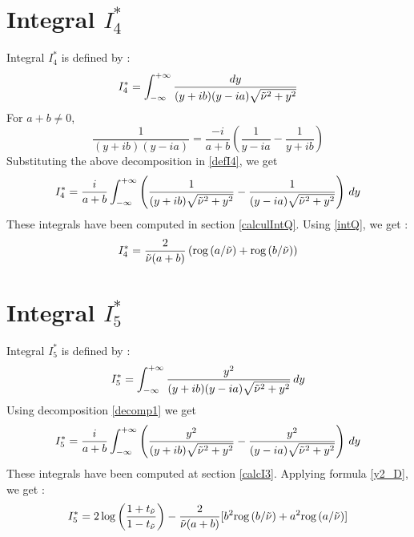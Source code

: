 \section{Integral $I_4^*$}
\label{calcI4}
Integral $I_4^*$ is defined by :
\begin{equation}
I_4^*=\int_{-\infty}^{+\infty} \dfrac{dy}{(y+ib)(y-ia)\sqrt{\tilde{\nu}^2+y^2}}
\label{defI4}
\end{equation}
For $a+b\neq0$, 
\begin{equation}
    \frac{1}{(y+ib)(y-ia)}=\frac{-i}{a+b}\left( \frac{1}{y-ia}-\frac{1}{y+ib}\right)
    \label{decomp1}
\end{equation}
Substituting the above decomposition in \eqref{defI4}, we get
\begin{equation}
I_4^*=\frac{i}{a+b} \int_{-\infty}^{+\infty} \left(\frac{1}{(y+ib)\sqrt{\tilde{\nu}^2+y^2}}-\frac{1}{(y-ia)\sqrt{\tilde{\nu}^2+y^2}} \right)\,dy
\end{equation}
These integrals have been computed in section \ref{calculIntQ}. Using \eqref{intQ}, we get :
\begin{equation}
I_4^*=\frac{2}{\tilde{\nu}(a+b)}\left(\mbox{rog}\left(a/\tilde{\nu}\right)+\mbox{rog}\left(b/\tilde{\nu}\right) \right)
\label{valI4}
\end{equation}

\section{Integral $I_5^*$}
\label{calcI5}

Integral $I_5^*$ is defined by :
\begin{equation}
I_5^*=\int_{-\infty}^{+\infty} \frac{y^2}{(y+ib)(y-ia)\sqrt{\tilde{\nu}^2+y^2}}\,dy
\end{equation}
Using decomposition \eqref{decomp1} we get
\begin{equation}
I_5^*=\frac{i}{a+b}\int_{-\infty}^{+\infty}\left( \frac{y^2}{(y+ib)\sqrt{\tilde{\nu}^2+y^2}}-\frac{y^2}{(y-ia)\sqrt{\tilde{\nu}^2+y^2}}\right)\,dy
\end{equation}
These integrals have been computed at section \ref{calcI3}. Applying formula \eqref{y2_D}, we get :
\begin{equation}
I_5^*=2\log\left(\frac{1+t_{\tilde{\nu}}}{1-t_{\tilde{\nu}}}\right)-\frac{2}{\tilde{\nu}(a+b)}\lbrack b^2\mbox{rog}\left(b/\tilde{\nu}\right)+a^2\mbox{rog}\left(a/\tilde{\nu}\right)\rbrack
\label{intI5}
\end{equation}

